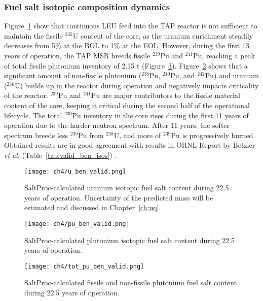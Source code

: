 \subsubsection{Fuel salt isotopic composition dynamics}
Figure~\ref{fig:u-ben-valid} show that continuous \gls{LEU} feed into the 
\gls{TAP} reactor is not sufficient to maintain the fissile $^{235}$U content 
of the core, as the uranium enrichment steadily decreases from 5\% at the 
\gls{BOL} to 1\% at the \gls{EOL}. However, during the first 13 years of 
operation, the \gls{TAP} \gls{MSR} breeds fissile $^{239}$Pu and $^{241}$Pu, 
reaching a peak of total fissile plutonium inventory of 2.15 t  
(Figure~\ref{fig:pu-fiss-ben-valid}). Figure~\ref{fig:pu-ben-valid} shows that
a significant amount of non-fissile 
plutonium ($^{238}$Pu, $^{240}$Pu, and $^{242}$Pu) and uranium ($^{236}$U) 
builds up in the reactor during operation and negatively impacts criticality 
of the reactor. $^{239}$Pu and $^{241}$Pu are major contributors to the 
fissile material content of the core, keeping it critical during the second 
half of the operational lifecycle. The total $^{239}$Pu inventory in the core 
rises during the first 11 years of operation due to the harder neutron 
spectrum. After 11 years, the softer spectrum breeds less $^{239}$Pu from 
$^{238}$U, and more of $^{239}$Pu is progressively burned. Obtained results 
are in good agreement with results in ORNL Report by Betzler \emph{et al.} 
(Table~\ref{tab:valid_ben_isos}) \cite{betzler_assessment_2017-1}.

\begin{figure}[htp!] %
	\centering
	\texttt{[image: ch4/u\_ben\_valid.png]}
	\caption{SaltProc-calculated uranium isotopic fuel salt content during 
	22.5 years of operation. Uncertainty of the predicted mass will be 
	estimated and discussed in Chapter~\ref{ch:uq}.}
	\label{fig:u-ben-valid}
\end{figure}

\begin{figure}[htp!] %
	\centering
	\texttt{[image: ch4/pu\_ben\_valid.png]}
		\vspace{-4mm}
	\caption{SaltProc-calculated plutonium isotopic fuel salt content during 
		22.5 years of operation.}
	\label{fig:pu-ben-valid}
\end{figure}
\begin{figure}[hbp!] %
	\centering
	\texttt{[image: ch4/tot\_pu\_ben\_valid.png]}
		\vspace{-4mm}
	\caption{SaltProc-calculated fissile and non-fissile plutonium fuel salt 
	content during 22.5 years of operation.}
	\label{fig:pu-fiss-ben-valid}
\end{figure}

